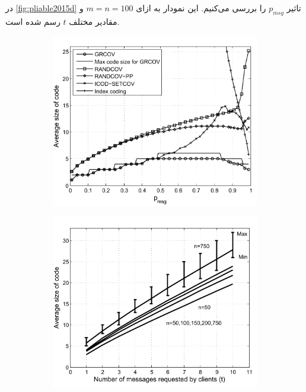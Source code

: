 در
\autoref{fig:pliable2015d}
تاثیر
$p_{msg}$
را بررسی می‌کنیم. این نمودار به ازای
$m = n = 100$
و مقادیر مختلف
$t$
رسم شده است.
\begin{figure}
    \centering
    \begin{subfigure}[b]{0.45\textwidth}
        \centering
        \includegraphics[width=\textwidth]{figs/ch3/pliable2015_a}
        \caption{}
        \label{fig:pliable2015a}
    \end{subfigure}
    \hfill
    \begin{subfigure}[b]{0.45\textwidth}
        \centering
        \includegraphics[width=\textwidth]{figs/ch3/pliable2015_b}

\end{subfigure}
\end{figure}
